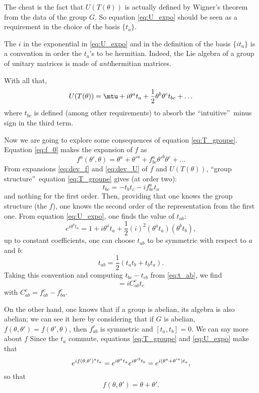 The cheat is the fact that $U(T(\theta))$ is actually defined by Wigner's theorem from the data of the group $G$. So equation \eqref{eq:U_expo} should be seen as a requirement in the choice of the basis $\{t_a\}$.

\begin{remark}
	The $i$ in the exponential in \eqref{eq:U_expo} and in the definition of the basis $\{it_a\}$ is a convention in order the $t_a$'s to be hermitian. Indeed, the Lie algebra of a group of unitary matrices is made of \emph{anti}hermitian matrices.
\end{remark}

With all that,
\begin{equation}\label{eq:dev_U}
	U(T(\theta))=\mtu+i\theta^at_a+\frac{1}{2}\theta^b\theta^ct_{bc}+\ldots
\end{equation}
where $t_{bc}$ is defined (among other requirements) to absorb the ``intuitive''\ minus sign in the third term.

Now we are going to explore some consequences of equation \eqref{eq:T_groupe}. Equation \eqref{eq:f_0} makes the expansion of $f$ as
\begin{equation}\label{eq:dev_f}
	f^a(\theta',\theta)=\theta^a+{\theta'}^a+f^a_{bc}{\theta'}^b\theta^c+\ldots
\end{equation}
From expansions \eqref{eq:dev_f} and \eqref{eq:dev_U} of $f$ and $U(T(\theta))$, ``group structure''\ equation \eqref{eq:T_groupe} gives (at order two):
\begin{equation}\label{eq:t_ab}
	t_{bc}=-t_bt_c-if^a_{bc}t_a
\end{equation}
and nothing for the first order. Then, providing that one knows the group structure (the $f$), one knows the second order of the representation from the first one.
From equation \eqref{eq:U_expo}, one finds the value of $t_{ab}$:
\[
	e^{i\theta^at_a}=1+i\theta^at_a+\frac{1}{2}(i)^2(\theta^at_a)(\theta^bt_b),
\]
up to constant coefficients, one can choose $t_{ab}$ to be symmetric with respect to $a$ and $b$:
\[
	t_{ab}=\frac{1}{2}(t_at_b+t_bt_a).
\]
Taking this convention and computing $t_{bc}-t_{cb}$ from \eqref{eq:t_ab}, we find
\begin{equation}
	[t_a,t_b]=iC_{ab}^ct_c
\end{equation}
with $C_{ab}^c=f_{ab}^c-f_{ba}^c$.

On the other hand, one knows that if a group is abelian, its algebra is also abelian; we can see it here by considering that if $G$ is abelian, $f(\theta,\theta')=f(\theta',\theta)$, then $f_{ab}^c$ is symmetric and $[t_a,t_b]=0$. We can say more about $f$ Since the $t_a$ commute, equations \eqref{eq:T_groupe} and \eqref{eq:U_expo} make that
\begin{equation}
	e^{if(\theta,\theta')^at_a}=e^{i\theta^at_a}e^{i{\theta'}^bt_b}\\
	=e^{i(\theta^a+{\theta'}^a)t_a},
\end{equation}
so that
\[
	f(\theta,\theta')=\theta+\theta'.
\]

